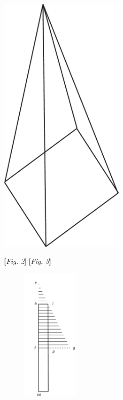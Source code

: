 \hspace{30mm}
\begin{minipage}[t]{0.5\textwidth}
\includegraphics[width=0.45\textwidth]{images/LH37,4_49r-4.pdf}
\end{minipage}
\pend
\vspace{3mm}
\pstart
\hspace{18mm}  [\textit{Fig. 2}]\hspace*{69mm}  [\textit{Fig. 3}]
\pend
\count{}
\count{}
\count{}
\newpage
\pstart%
\begin{figure}\vspace{-5mm}
\noindent \includegraphics[trim = 19mm -1mm -5mm 17mm, clip, width=0.24\textwidth]{images/LH37,4_49r-2.pdf}\\
\noindent {} 
\end{figure}
